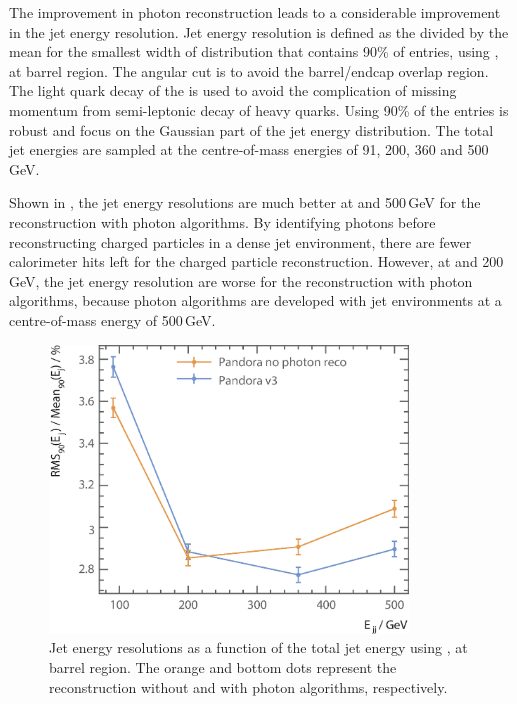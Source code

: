 The improvement in photon reconstruction leads to a considerable improvement in the jet energy resolution. Jet energy resolution is defined as the \rms divided by the mean for the smallest width of distribution that contains 90\% of entries, using \eeZuds, at barrel region. The angular cut is to avoid the barrel/endcap overlap region. The light quark decay of the \Zprime is used   to avoid the complication of missing momentum from semi-leptonic decay of heavy quarks. Using 90\% of the entries is robust and focus on the Gaussian part of the jet energy distribution. The total jet energies are   sampled at the centre-of-mass energies of 91, 200, 360 and 500\,GeV.

Shown in , the jet energy resolutions are much better at  and 500\,GeV for the reconstruction with photon algorithms. By identifying photons before reconstructing charged particles in a dense jet environment, there are fewer calorimeter hits left for the charged particle reconstruction. However, at  and 200\,GeV, the jet energy resolution are worse  for the reconstruction with photon algorithms, because photon algorithms are developed with  jet environments at a centre-of-mass energy of 500\,GeV.

\begin{figure}[!tbph]
\centering
\includegraphics[width=0.85\textwidth]{photon/JERmuon2}
\caption[Jet energy resolution as a function of the total jet energy without and with photon related algorithms]
{Jet energy resolutions as a function of the  total jet energy using \eeZuds,  at barrel region. The orange and bottom dots represent the reconstruction without and with photon algorithms, respectively.}
\label{fig:photonJERmuon}
\end{figure}


